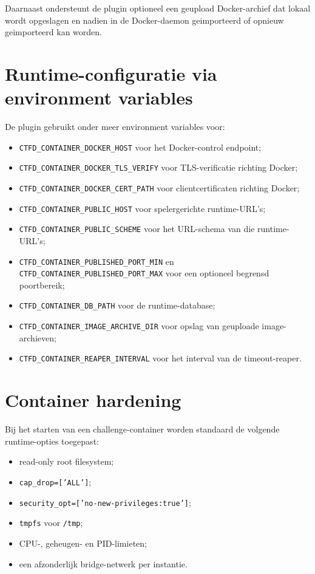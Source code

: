 \documentclass[dutch,dit,thesis]{hogentreport}
\begin{document}
Daarnaast ondersteunt de plugin optioneel een geupload Docker-archief dat lokaal wordt opgeslagen en nadien in de Docker-daemon geimporteerd of opnieuw geimporteerd kan worden.

\section*{Runtime-configuratie via environment variables}

De plugin gebruikt onder meer environment variables voor:

\begin{itemize}
  \item \texttt{CTFD\_CONTAINER\_DOCKER\_HOST} voor het Docker-control endpoint;
  \item \texttt{CTFD\_CONTAINER\_DOCKER\_TLS\_VERIFY} voor TLS-verificatie richting Docker;
  \item \texttt{CTFD\_CONTAINER\_DOCKER\_CERT\_PATH} voor clientcertificaten richting Docker;
  \item \texttt{CTFD\_CONTAINER\_PUBLIC\_HOST} voor spelergerichte runtime-URL's;
  \item \texttt{CTFD\_CONTAINER\_PUBLIC\_SCHEME} voor het URL-schema van die runtime-URL's;
  \item \texttt{CTFD\_CONTAINER\_PUBLISHED\_PORT\_MIN} en \texttt{CTFD\_CONTAINER\_PUBLISHED\_PORT\_MAX} voor een optioneel begrensd poortbereik;
  \item \texttt{CTFD\_CONTAINER\_DB\_PATH} voor de runtime-database;
  \item \texttt{CTFD\_CONTAINER\_IMAGE\_ARCHIVE\_DIR} voor opslag van geuploade image-archieven;
  \item \texttt{CTFD\_CONTAINER\_REAPER\_INTERVAL} voor het interval van de timeout-reaper.
\end{itemize}

\section*{Container hardening}

Bij het starten van een challenge-container worden standaard de volgende runtime-opties toegepast:

\begin{itemize}
  \item read-only root filesystem;
  \item \texttt{cap\_drop=['ALL']};
  \item \texttt{security\_opt=['no-new-privileges:true']};
  \item \texttt{tmpfs} voor \texttt{/tmp};
  \item CPU-, geheugen- en PID-limieten;
  \item een afzonderlijk bridge-netwerk per instantie.
\end{itemize}
\end{document}
